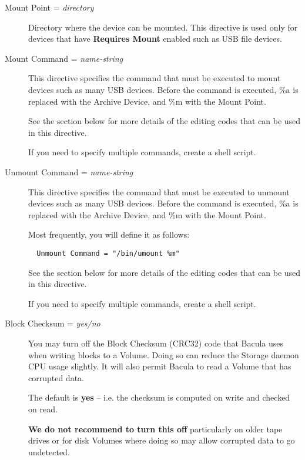 \begin{description}
\item [Mount Point = {\it directory}]
   Directory where the device can be mounted. 
   This directive is used only
   for devices that have {\bf Requires Mount} enabled such as 
   USB file devices.

\item [Mount Command = {\it name-string}]
   This directive specifies the command that must be executed to mount 
   devices such as many USB devices. Before the command is 
   executed, \%a is replaced with the Archive Device, and \%m with the Mount 
   Point.

See the  section below for more details of
the editing codes that can be used in this directive.

  If you need to specify multiple commands, create a shell script.

\item [Unmount Command = {\it name-string}]
   This directive specifies the command that must be executed to unmount 
   devices such as many USB devices. Before the command  is
   executed, \%a is replaced with the Archive Device, and \%m with the  Mount
   Point.

   Most frequently, you will define it as follows:  

\footnotesize
\begin{verbatim}
  Unmount Command = "/bin/umount %m"
\end{verbatim}
\normalsize

See the  section below for more details of
the editing codes that can be used in this directive.

  If you need to specify multiple commands, create a shell script.

\item[Block Checksum = {\it yes/no}]

  You may turn off the Block Checksum (CRC32) code that Bacula uses when
  writing blocks to a Volume. Doing so can reduce the Storage daemon CPU usage
  slightly.  It will also permit Bacula to read a Volume that has corrupted
  data.

  The default is {\bf yes} -- i.e. the checksum is computed on write and
  checked on read.

  \textbf{We do not recommend to turn this off} particularly on older tape
  drives or for disk Volumes where doing so may allow corrupted data to go
  undetected.


\end{description}
